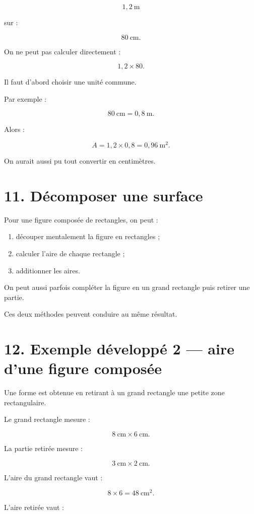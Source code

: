 \[
1{,}2\ \text{m}
\]

sur :

\[
80\ \text{cm}.
\]

On ne peut pas calculer directement :

\[
1{,}2\times80.
\]

Il faut d’abord choisir une unité commune.

Par exemple :

\[
80\ \text{cm}=0{,}8\ \text{m}.
\]

Alors :

\[
A=1{,}2\times0{,}8=0{,}96\ \text{m}^2.
\]

On aurait aussi pu tout convertir en centimètres.

\section{11. Décomposer une surface}

Pour une figure composée de rectangles, on peut :

\begin{enumerate}
\item découper mentalement la figure en rectangles ;
\item calculer l’aire de chaque rectangle ;
\item additionner les aires.
\end{enumerate}

On peut aussi parfois compléter la figure en un grand rectangle puis retirer une partie.

Ces deux méthodes peuvent conduire au même résultat.

\section{12. Exemple développé 2 — aire d’une figure composée}

Une forme est obtenue en retirant à un grand rectangle une petite zone rectangulaire.

Le grand rectangle mesure :

\[
8\ \text{cm}\times6\ \text{cm}.
\]

La partie retirée mesure :

\[
3\ \text{cm}\times2\ \text{cm}.
\]

L’aire du grand rectangle vaut :

\[
8\times6=48\ \text{cm}^2.
\]

L’aire retirée vaut :

